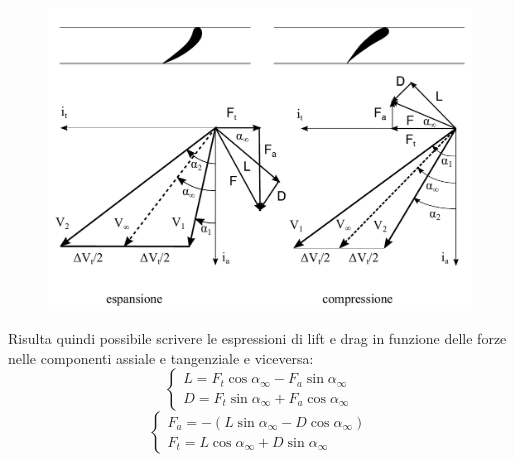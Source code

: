\begin{figure}
\centering
  \includegraphics[width=.7\textwidth]{fig/triang1.pdf}
\caption{}
\label{fig:triang1}
\end{figure}
Risulta quindi possibile scrivere le espressioni di lift e drag in funzione delle forze nelle componenti assiale e tangenziale e viceversa:
\begin{equation}
	\begin{cases} 
		L = F_t \cos \alpha_{\infty} -  F_a \sin \alpha_{\infty}\\
		D = F_t \sin \alpha_{\infty} +  F_a \cos \alpha_{\infty}
	\end{cases}
\end{equation}
\begin{equation}
	\begin{cases} 
		F_a = - (L\sin \alpha_{\infty} -  D \cos \alpha_{\infty})\\
		F_t = L \cos \alpha_{\infty} +  D \sin \alpha_{\infty}
	\end{cases}
\end{equation}
